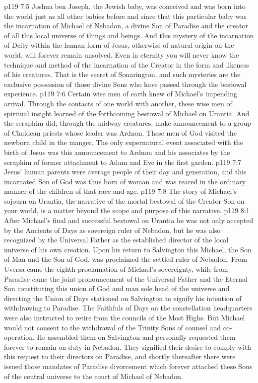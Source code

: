 \vs p119 7:5 Joshua ben Joseph, the Jewish baby, was conceived and was born into the world just as all other babies before and since  that this particular baby was the incarnation of Michael of Nebadon, a divine Son of Paradise and the creator of all this local universe of things and beings. And this mystery of the incarnation of Deity within the human form of Jesus, otherwise of natural origin on the world, will forever remain unsolved. Even in eternity you will never know the technique and method of the incarnation of the Creator in the form and likeness of his creatures. That is the secret of Sonarington, and such mysteries are the exclusive possession of those divine Sons who have passed through the bestowal experience.
\vs p119 7:6 Certain wise men of earth knew of Michael’s impending arrival. Through the contacts of one world with another, these wise men of spiritual insight learned of the forthcoming bestowal of Michael on Urantia. And the seraphim did, through the midway creatures, make announcement to a group of Chaldean priests whose leader was Ardnon. These men of God visited the newborn child in the manger. The only supernatural event associated with the birth of Jesus was this announcement to Ardnon and his associates by the seraphim of former attachment to Adam and Eve in the first garden.
\vs p119 7:7 Jesus’ human parents were average people of their day and generation, and this incarnated Son of God was thus born of woman and was reared in the ordinary manner of the children of that race and age.
\pc \vs p119 7:8 The story of Michael’s sojourn on Urantia, the narrative of the mortal bestowal of the Creator Son on your world, is a matter beyond the scope and purpose of this narrative.
\vs p119 8:1 After Michael’s final and successful bestowal on Urantia he was not only accepted by the Ancients of Days as sovereign ruler of Nebadon, but he was also recognized by the Universal Father as the established director of the local universe of his own creation. Upon his return to Salvington this Michael, the Son of Man and the Son of God, was proclaimed the settled ruler of Nebadon. From Uversa came the eighth proclamation of Michael’s sovereignty, while from Paradise came the joint pronouncement of the Universal Father and the Eternal Son constituting this union of God and man sole head of the universe and directing the Union of Days stationed on Salvington to signify his intention of withdrawing to Paradise. The Faithfuls of Days on the constellation headquarters were also instructed to retire from the councils of the Most Highs. But Michael would not consent to the withdrawal of the Trinity Sons of counsel and co\hyp{}operation. He assembled them on Salvington and personally requested them forever to remain on duty in Nebadon. They signified their desire to comply with this request to their directors on Paradise, and shortly thereafter there were issued those mandates of Paradise divorcement which forever attached these Sons of the central universe to the court of Michael of Nebadon.
